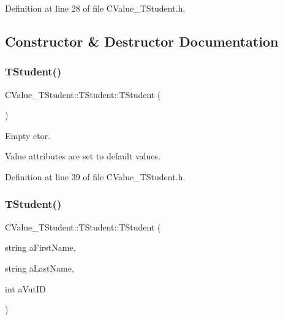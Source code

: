 Definition at line 28 of file C\+Value\+\_\+\+T\+Student.\+h.



\subsection{Constructor \& Destructor Documentation}
\mbox{\label{class_c_value___t_student_1_1_t_student_a74a3e09459dba1212903e64ed0e2dd12}} 
\subsubsection{\texorpdfstring{T\+Student()}{TStudent()}\hspace{0.1cm}{\footnotesize\ttfamily [1/2]}}
{\footnotesize\ttfamily C\+Value\+\_\+\+T\+Student\+::\+T\+Student\+::\+T\+Student (\begin{DoxyParamCaption}{ }\end{DoxyParamCaption})\hspace{0.3cm}{\ttfamily [inline]}}



Empty c\textquotesingle{}tor. 

Value attributes are set to default values. 

Definition at line 39 of file C\+Value\+\_\+\+T\+Student.\+h.

\mbox{\label{class_c_value___t_student_1_1_t_student_a4bac9f104a6e45a8af711c44fdc04f49}} 
\subsubsection{\texorpdfstring{T\+Student()}{TStudent()}\hspace{0.1cm}{\footnotesize\ttfamily [2/2]}}
{\footnotesize\ttfamily C\+Value\+\_\+\+T\+Student\+::\+T\+Student\+::\+T\+Student (\begin{DoxyParamCaption}\item[{string}]{a\+First\+Name,  }\item[{string}]{a\+Last\+Name,  }\item[{int}]{a\+Vut\+ID }\end{DoxyParamCaption})\hspace{0.3cm}{\ttfamily [inline]}}



